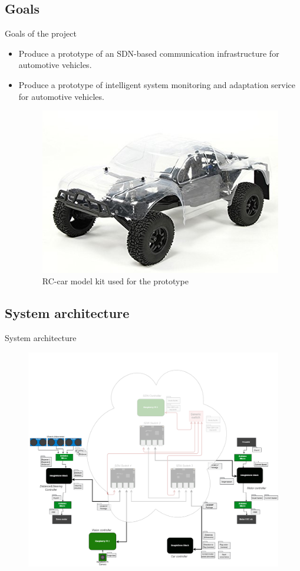 \documentclass{beamer}
\begin{document}
\subsection{Goals}
\begin{frame}{Goals of the project}
    \begin{itemize}
        \item Produce a prototype of an SDN-based communication infrastructure for automotive vehicles.
        \item Produce a prototype of intelligent system monitoring and adaptation service for automotive vehicles.
        \begin{figure}
            \includegraphics[width=0.5\linewidth]{turnigy_car.jpg}
            \caption{RC-car model kit used for the prototype}
        \end{figure}
    \end{itemize}
\end{frame}


\subsection{System architecture}
\begin{frame}{System architecture}
    \begin{figure}
        \includegraphics[width=0.75\linewidth]{network.png}
    \end{figure}
\end{frame}
\end{document}

